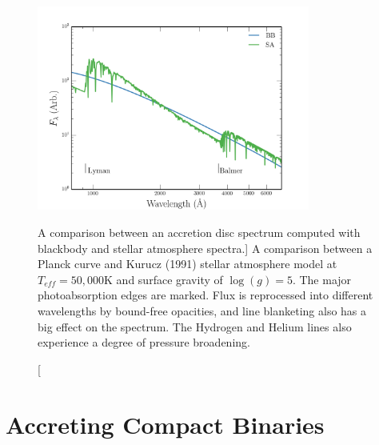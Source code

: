 \begin{figure}
\centering
\includegraphics[width=0.8\textwidth]{figures/01-intro/disc_spectrum_comparison.png}
\caption
[A comparison between an accretion disc spectrum computed 
with blackbody and stellar atmosphere spectra.]
{
A comparison between a Planck curve and Kurucz (1991) stellar atmosphere model
at $T_{eff}=50,000$K and surface gravity of $\log(g)=5$. The major photoabsorption
edges are marked. Flux is reprocessed into different wavelengths by bound-free opacities,
and line blanketing also has a big effect on the spectrum. The Hydrogen and Helium lines
also experience a degree of pressure broadening.
} 
\label{fig:bb_v_sa}
\end{figure}



\section{Accreting Compact Binaries}

